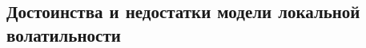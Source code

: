 






\subsection{Достоинства и недостатки модели локальной волатильности}
\label{lv:s:discussion}

